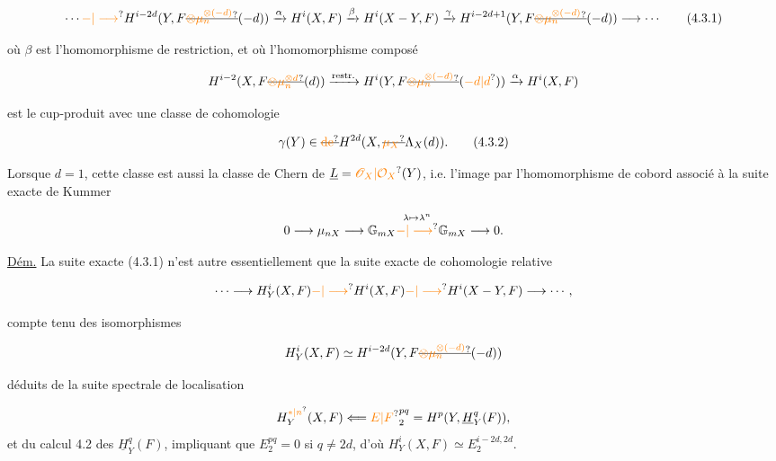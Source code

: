 \[
\cdots\unsure{{-}|\longrightarrow}H^{i-2d}(Y,F\deleted{\unsure{\otimes\mu_n^{\otimes(-d)}}}(-d))
\xrightarrow{\alpha}H^i(X,F)\xrightarrow{\beta}H^i(X-Y,F)
\xrightarrow{\gamma}H^{i-2d+1}(Y,F\deleted{\unsure{\otimes\mu_n^{\otimes(-d)}}}(-d))\longrightarrow\cdots
\tag*{(4.3.1)}
\]

où $\beta$ est l'homomorphisme de restriction, et où l'homomorphisme composé

\[
H^{i-2}(X,F\deleted{\unsure{\otimes\mu_n^{\otimes d}}}(d))
\xrightarrow{\text{restr.}}H^i(Y,F\deleted{\unsure{\otimes\mu_n^{\otimes(-d)}}}(\unsure{-d|d}))
\xrightarrow{\alpha}H^i(X,F)
\]

est le cup-produit avec une classe de cohomologie  

\[
\gamma(Y)\in\deleted{\unsure{\text{de}}}H^{2d}(X,\deleted{\unsure{\mu_X}}\Lambda_X(d)).
\tag*{(4.3.2)}
\]

 Lorsque $d=1$,  cette classe est aussi la  classe de Chern de $\underline L=\unsure{\mathscr O_X|\mathcal O_X}(Y)$, i.e. l'image  par l'homomorphisme  de cobord associé à la suite exacte de Kummer

\[
0\longrightarrow\mu_{nX}\longrightarrow\mathbb G_{mX}\overset{\lambda\mapsto\lambda^n}{\unsure{{-}|\longrightarrow}}\mathbb G_{mX}\longrightarrow 0.
\]

\uline{Dém.} La suite exacte (4.3.1) n'est autre essentiellement que la suite exacte de cohomologie relative

\[
\cdots\longrightarrow H^i_Y(X,F)\unsure{{-}|\longrightarrow}H^i(X,F)\unsure{{-}|\longrightarrow}H^i(X-Y,F)\longrightarrow\cdots,
\]

compte tenu des isomorphismes

\[
H^i_Y(X,F)\simeq H^{i-2d}(Y,F\deleted{\unsure{\otimes\mu_n^{\otimes(-d)}}}(-d))
\]

déduits de la suite spectrale de localisation

\[
H^{\unsure{*|n}}_Y(X,F)\Longleftarrow\unsure{E|F}^{pq}_2=H^p(Y,\underline H^q_Y(F)),
\]
et du calcul 4.2 des $\underline H^q_Y(F)$, impliquant que $E^{pq}_2=0$ si $q\ne 2d$, d'où $H^i_Y(X,F)\simeq E^{i-2d,2d}_2$.

